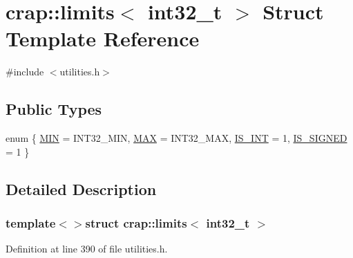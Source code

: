 \hypertarget{structcrap_1_1limits_3_01int32__t_01_4}{}\section{crap\+:\+:limits$<$ int32\+\_\+t $>$ Struct Template Reference}
\label{structcrap_1_1limits_3_01int32__t_01_4}


{\ttfamily \#include $<$utilities.\+h$>$}

\subsection*{Public Types}
\begin{DoxyCompactItemize}
\item 
enum \{ \hyperlink{structcrap_1_1limits_3_01int32__t_01_4_afa004d2c265fa2323ca9a5a56981da20a38dc1df75abcbe660a6b95482164241a}{M\+I\+N} = I\+N\+T32\+\_\+\+M\+I\+N, 
\hyperlink{structcrap_1_1limits_3_01int32__t_01_4_afa004d2c265fa2323ca9a5a56981da20a0cadb85e49c844a9793962df51e64147}{M\+A\+X} = I\+N\+T32\+\_\+\+M\+A\+X, 
\hyperlink{structcrap_1_1limits_3_01int32__t_01_4_afa004d2c265fa2323ca9a5a56981da20adfcf8fb95d67edb7b835681a18ce0949}{I\+S\+\_\+\+I\+N\+T} = 1, 
\hyperlink{structcrap_1_1limits_3_01int32__t_01_4_afa004d2c265fa2323ca9a5a56981da20a181802a9b60de9f8d0bd62f5b02124bd}{I\+S\+\_\+\+S\+I\+G\+N\+E\+D} = 1
 \}
\end{DoxyCompactItemize}


\subsection{Detailed Description}
\subsubsection*{template$<$$>$struct crap\+::limits$<$ int32\+\_\+t $>$}



Definition at line 390 of file utilities.\+h.



